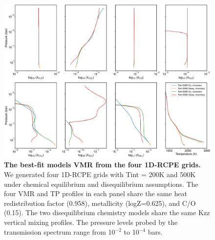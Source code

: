 \documentclass[sn-standardnature]{sn-jnl}%
\begin{document}
\begin{figure}[!htbp]
\centering
  \includegraphics[width=\textwidth,keepaspectratio]{figs/SI_Fig1.png}
  \caption{\textbf{The best-fit models VMR from the four 1D-RCPE grids.} We generated four 1D-RCPE grids with Tint = 200K and 500K under chemical equilibrium and disequilibrium assumptions. The four VMR and TP profiles in each panel share the same heat redistribution factor (0.958), metallicity (logZ=0.625), and C/O (0.15). The two disequilibrium chemistry models share the same Kzz vertical mixing profiles. The pressure levels probed by the transmission spectrum range from 10$^{-2}$ to 10$^{-4}$ bars.}
  \label{fig:grid_vmr}
\end{figure}
\end{document}
